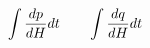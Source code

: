 \documentclass[preview]{standalone}
\begin{document}
\begin{align*}
\special{dvisvgm:raw <g id='unique000'>}\int \frac{dp}{dH} dt \qquad \int \frac{dq}{dH} dt\special{dvisvgm:raw </g>}
\end{align*}
\end{document}
